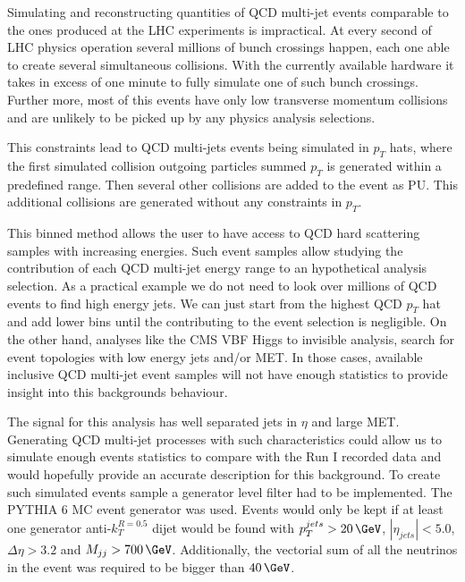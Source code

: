 
Simulating and reconstructing quantities of \gls{QCD} multi-jet events comparable to the ones produced at the \gls{LHC} experiments is impractical. At every second of \gls{LHC} physics operation several millions of bunch crossings happen, each one able to create several simultaneous collisions. With the currently available hardware it takes in excess of one minute to fully simulate one of such bunch crossings. Further more, most of this events have only low transverse momentum collisions and are unlikely to be picked up by any physics analysis selections.

This constraints lead to \gls{QCD} multi-jets events being simulated in $p_T$ hats, where the first simulated collision outgoing particles summed $p_T$ is generated within a predefined range. Then several other collisions are added to the event as \gls{PU}. This additional collisions are generated without any constraints in $p_T$. 

This binned method allows the user to have access to \gls{QCD} hard scattering samples with increasing energies. Such event samples allow studying the contribution of each \gls{QCD} multi-jet energy range to an hypothetical analysis selection. As a practical example we do not need to look over millions of \gls{QCD} events to find high energy jets. We can just start from the highest \gls{QCD} $p_T$ hat and add lower bins until the contributing to the event selection is negligible. On the other hand, analyses like the \gls{CMS} \gls{VBF} Higgs to invisible analysis, search for event topologies with low energy jets and/or \gls{MET}. In those cases, available inclusive \gls{QCD} multi-jet event samples will not have enough statistics to provide insight into this backgrounds behaviour.

The signal for this analysis has well separated jets in $\eta$ and large \gls{MET}. Generating \gls{QCD} multi-jet processes with such characteristics could allow us to simulate enough events statistics to compare with the Run I recorded data and would hopefully provide an accurate description for this background. To create such simulated events sample a generator level filter had to be implemented. The \textsc{PYTHIA 6} \gls{MC} event generator was used. Events would only be kept if at least one generator anti-$k_T^{R=0.5}$ dijet would be found with $p_T^{jets}>20\,\GeV$, $|\eta_{jets}|<5.0$, $\Delta\eta>3.2$ and $M_{jj}>700\,\GeV$. Additionally, the vectorial sum of all the neutrinos in the event was required to be bigger than $40\,\GeV$. 

